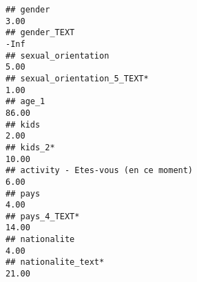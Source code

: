 \documentclass[
]{article}
\begin{document}
\begin{verbatim}
## gender                                                                                                                                                                                                                         3.00
## gender_TEXT                                                                                                                                                                                                                    -Inf
## sexual_orientation                                                                                                                                                                                                             5.00
## sexual_orientation_5_TEXT*                                                                                                                                                                                                     1.00
## age_1                                                                                                                                                                                                                         86.00
## kids                                                                                                                                                                                                                           2.00
## kids_2*                                                                                                                                                                                                                       10.00
## activity - Etes-vous (en ce moment)                                                                                                                                                                                            6.00
## pays                                                                                                                                                                                                                           4.00
## pays_4_TEXT*                                                                                                                                                                                                                  14.00
## nationalite                                                                                                                                                                                                                    4.00
## nationalite_text*                                                                                                                                                                                                             21.00

\end{verbatim}
\end{document}
